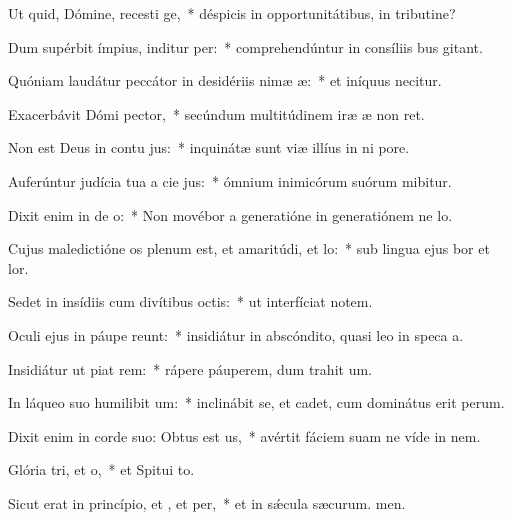\item Ut quid, Dómine, recesti ge,~* déspicis in opportunitátibus, in tributine?
\item Dum supérbit ímpius, inditur per:~* comprehendúntur in consíliis bus gitant.
\item Quóniam laudátur peccátor in desidériis nimæ æ:~* et iníquus necitur.
\item Exacerbávit Dómi pector,~* secúndum multitúdinem iræ æ non ret.
\item Non est Deus in contu jus:~* inquinátæ sunt viæ illíus in ni pore.
\item Auferúntur judícia tua a cie jus:~* ómnium inimicórum suórum mibitur.
\item Dixit enim in de o:~* Non movébor a generatióne in generatiónem ne lo.
\item Cujus maledictióne os plenum est, et amaritúdi, et lo:~* sub lingua ejus bor et lor.
\item Sedet in insídiis cum divítibus  octis:~* ut interfíciat notem.
\item Oculi ejus in páupe reunt:~* insidiátur in abscóndito, quasi leo in speca a.
\item Insidiátur ut piat rem:~* rápere páuperem, dum trahit um.
\item In láqueo suo humilibit um:~* inclinábit se, et cadet, cum dominátus erit perum.
\item Dixit enim in corde suo: Obtus est us,~* avértit fáciem suam ne víde in nem.
\item Glória tri, et o,~* et Spitui to.
\item Sicut erat in princípio, et , et per,~* et in sǽcula sæcurum. men.

